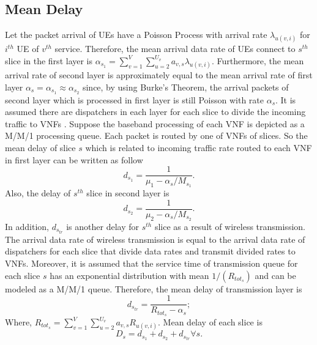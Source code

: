 \documentclass[conference]{IEEEtran}
\begin{document}
\subsection{Mean Delay}
Let the packet arrival of UEs have a Poisson Process with arrival rate $\lambda_{u(v,i)}$ for $i^{th}$ UE of $v^{th}$ service. 
Therefore, the mean arrival data rate of UEs connect to $s^{th}$ slice in the first layer is 
$\alpha_{s_1} = \sum_{v=1}^{V}\sum_{u=2}^{U_v}a_{v,s}\lambda_{u(v,i)}$.  
Furthermore, the mean arrival rate of second layer is approximately equal to the mean arrival rate of first layer $\alpha_{s} =\alpha_{s_1} \approx \alpha_{s_2}$ since, by using Burke’s Theorem, the arrival packets of second layer which is processed in first layer is still Poisson with rate $\alpha_{s}$. 
It is assumed there are dispatchers in each layer for each slice to divide the incoming traffic to VNFs \cite{frdl,luong2018novel,luong2018novel1}.
Suppose the baseband processing of each VNF is depicted as a M/M/1 processing queue.
Each packet is routed by one of VNFs of slices. So the mean delay of slice $s$ which is related to incoming traffic rate routed to
each VNF in first layer can be written as follow
\begin{equation}
d_{s_1} = \frac{1}{\mu_1 - \alpha_{s}/{M_{s_1}}}.
\end{equation}
Also, the delay of $s^{th}$ slice in second layer is
\begin{equation}
d_{s_2} = \frac{1}{\mu_2 - \alpha_{s}/{M_{s_2}}}.
\end{equation}
In addition, $d_{s_{tr}}$ is another delay for $s^{th}$ slice as a result of wireless transmission. The arrival data rate of wireless transmission
 is equal to the arrival data rate of dispatchers for each slice that divide data rates and transmit divided rates to VNFs.
Moreover, it is assumed that the service time of transmission queue for each slice $s$ has 
 an exponential distribution with mean $1/(R_{{tot}_s})$ and can be modeled as a M/M/1 queue. Therefore, 
the mean delay of transmission layer is 
\begin{equation}
d_{s_{tr}} = \frac{1}{R_{{tot}_s} - \alpha_{s}};
\end{equation}
Where, $R_{{tot}_s} =  \sum_{v=1}^{V}\sum_{u=2}^{U_v}a_{v,s}R_{u(v,i)}$.
Mean delay of each slice is
\begin{equation}
D_{s} = d_{s_1} + d_{s_2} + d_{s_{tr}} \forall s.
\end{equation} 
\end{document}
